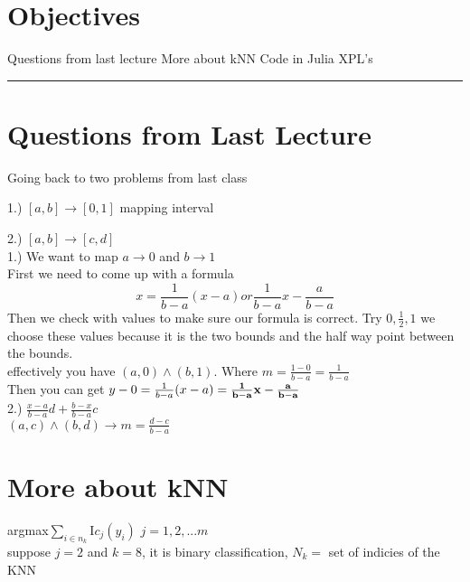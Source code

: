 
\section*{Objectives}
\begin{outline}
    \1 Questions from last lecture
    \1 More about kNN
    \1 Code in Julia
    \1 XPL's
\end{outline}

\rule[0.0051in]{\textwidth}{0.00025in}


\section{Questions from Last Lecture}
Going back to two problems from last class

1.) $[a,b] \rightarrow [0,1]$ mapping interval

2.) $[a,b] \rightarrow [c,d]$ \\

1.) We want to map $a \rightarrow 0$ and $b \rightarrow 1$ \\
First we need to come up with a formula
\[
    x=\frac{1}{b-a}(x-a) or \frac{1}{b-a}x-\frac{a}{b-a}
\]
Then we check with values to make sure our formula is correct.
Try $0,\frac{1}{2},1$ we choose these values because it is the two bounds and the half way point between the bounds. \\

effectively you have $(a,0) \land (b,1)$. Where $m=\frac{1-0}{b-a}=\frac{1}{b-a}$ \\

Then you can get $y-0=\frac{1}{b-a}(x-a)= \bold{\frac{1}{b-a}x-\frac{a}{b-a}}$\\

2.) $\frac{x-a}{b-a}d + \frac{b-x}{b-a}c$ \\
$(a,c) \land (b,d) \rightarrow m = \frac{d-c}{b-a}$ \\

\section{More about kNN}
argmax$\sum_{i \in n_k}^{}$I$c_j(y_i)$ $j={1,2,...m}$ \\
suppose $j=2$ and $k=8$, it is binary classification, $N_k=$ set of indicies of the KNN \\

